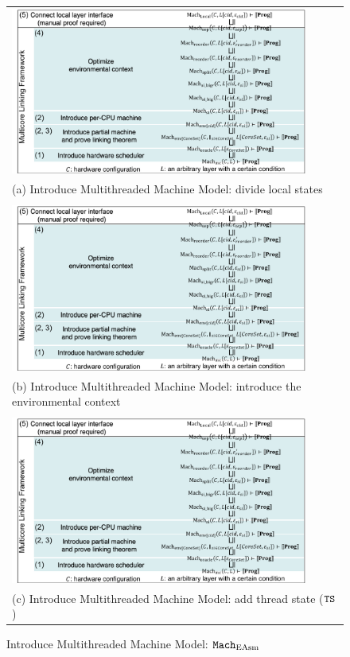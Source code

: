 \begin{figure}
\begin{tabular}{P{0.95\textwidth}}
\includegraphics[width=0.9\textwidth, page=3]{figs/conlink/concurrent_linking}\\
(a) Introduce Multithreaded Machine Model: divide local states\\
\\
\includegraphics[width=0.9\textwidth, page=4]{figs/conlink/concurrent_linking}\\
(b) Introduce Multithreaded Machine Model: introduce the environmental context\\
\\
\includegraphics[width=0.9\textwidth, page=5]{figs/conlink/concurrent_linking}\\
(c) Introduce Multithreaded Machine Model: add thread state (${\mathrm{\texttt{TS}}}$)
\end{tabular}
\caption{Introduce Multithreaded Machine Model: ${\mathrm{\texttt{Mach}}}_{\mathrm{EAsm}}$}
\label{fig:chapter:conlink:multithreaded-machine-model-easm}
\end{figure}

